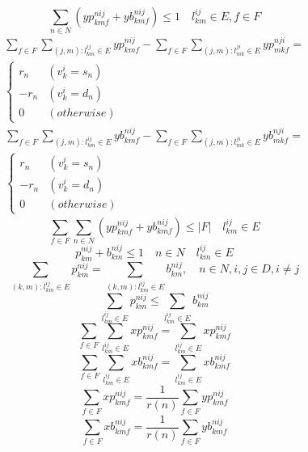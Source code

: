 \documentclass[a4j,twocolumn,fleqn]{jarticle}
\begin{document}
\begin{equation}%
\sum_{n \in N} (yp^{nij}_{kmf} + yb^{nij}_{kmf}) \leq 1 \quad l^{ij}_{km} \in E, f \in F
\end{equation}%
\begin{eqnarray}%
\sum_{f \in F}\sum_{(j,m):l^{ij}_{km}\in E}yp^{nij}_{kmf} - \sum_{f \in F}\sum_{(j,m):l^{ji}_{mk}\in E}yp^{nji}_{mkf}= \nonumber \\
\begin{cases}
r_n & (v^i_k = s_n)\\
-r_n & (v^i_k =d_n)\\
0 & (otherwise)
\end{cases}
\end{eqnarray}%
\begin{eqnarray}%
\sum_{f \in F}\sum_{(j,m):l^{ij}_{km}\in E}yb^{nij}_{kmf} - \sum_{f \in F}\sum_{(j,m):l^{ji}_{mk}\in E}yb^{nji}_{mkf}= \nonumber \\
\begin{cases}
r_n & (v^i_k = s_n)\\
-r_n & (v^i_k =d_n)\\
0 & (otherwise)
\end{cases}
\end{eqnarray}%
\begin{equation}
\sum_{f \in F} \sum_{n \in N}(yp^{nij}_{kmf}+yb^{nij}_{kmf}) \leq |F| \quad  l^{ij}_{km} \in E
\end{equation}
\begin{equation}
p^{nij}_{km} + b^{nij}_{km} \leq 1 \quad n \in N \quad l^{ij}_{km} \in E
\end{equation}
\begin{equation}
\sum_{(k,m):l^{ij}_{km}\in E}p^{nij}_{km} = \sum_{(k,m):l^{ij}_{km}\in E}b^{nij}_{km},\quad n \in N,i,j \in D, i\neq j
\end{equation}
\begin{equation}
\sum_{l^{ij}_{km}\in E}p^{nij}_{km} \leq \sum_{l^{ij}_{km}\in E}b^{nij}_{km}
\end{equation}
\begin{equation}
\sum_{f \in F}\sum_{l^{ij}_{km}\in E}xp^{nij}_{kmf}=\sum_{l^{ij}_{km} \in E}xp^{nij}_{kmf}
\end{equation}
\begin{equation}
\sum_{f \in F}\sum_{l^{ij}_{km}\in E}xb^{nij}_{kmf}=\sum_{l^{ij}_{km} \in E}xb^{nij}_{kmf}
\end{equation}
\begin{equation}
\sum_{f \in F}xp^{nij}_{kmf} = \frac{1}{r(n)}\sum_{f\in F}yp^{nij}_{kmf}
\end{equation}
\begin{equation}
\sum_{f \in F}xb^{nij}_{kmf} = \frac{1}{r(n)}\sum_{f\in F}yb^{nij}_{kmf}
\end{equation}
\end{document}

